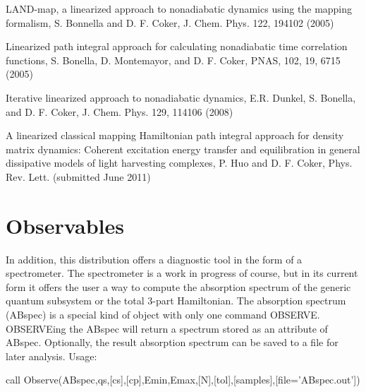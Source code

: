 \begin{DoxyEnumerate}
\item L\-A\-N\-D-\/map, a linearized approach to nonadiabatic dynamics using the mapping formalism, S. Bonnella and D. F. Coker, J. Chem. Phys. 122, 194102 (2005)\par

\item Linearized path integral approach for calculating nonadiabatic time correlation functions, S. Bonella, D. Montemayor, and D. F. Coker, P\-N\-A\-S, 102, 19, 6715 (2005)\par

\item Iterative linearized approach to nonadiabatic dynamics, E.\-R. Dunkel, S. Bonella, and D. F. Coker, J. Chem. Phys. 129, 114106 (2008)\par

\item A linearized classical mapping Hamiltonian path integral approach for density matrix dynamics\-: Coherent excitation energy transfer and equilibration in general dissipative models of light harvesting complexes, P. Huo and D. F. Coker, Phys. Rev. Lett. (submitted June 2011)\par
 \par
 
\end{DoxyEnumerate}\hypertarget{_interface_Observables}{}\section{Observables}\label{_interface_Observables}
In addition, this distribution offers a diagnostic tool in the form of a spectrometer. The spectrometer is a work in progress of course, but in its current form it offers the user a way to compute the absorption spectrum of the generic quantum subsystem or the total 3-\/part Hamiltonian. The absorption spectrum (A\-Bspec) is a special kind of object with only one command O\-B\-S\-E\-R\-V\-E. O\-B\-S\-E\-R\-V\-Eing the A\-Bspec will return a spectrum stored as an attribute of A\-Bspec. Optionally, the result absorption spectrum can be saved to a file for later analysis. Usage\-:\par
 \par
 call Observe(A\-Bspec,qs,\mbox{[}cs\mbox{]},\mbox{[}cp\mbox{]},Emin,Emax,\mbox{[}N\mbox{]},\mbox{[}tol\mbox{]},\mbox{[}samples\mbox{]},\mbox{[}file='A\-Bspec.\-out'\mbox{]})\par
 \par
